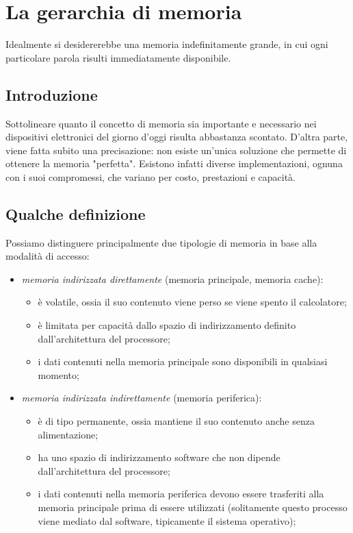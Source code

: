 \documentclass[class=book, crop=false, oneside]{standalone}
\begin{document}
\chapter{La gerarchia di memoria}\begin{fquote}Idealmente si desidererebbe una memoria indefinitamente grande, in cui ogni particolare parola risulti immediatamente disponibile.
 \end{fquote}

\section{Introduzione}
Sottolineare quanto il concetto di memoria sia importante e necessario nei dispositivi elettronici del giorno d'oggi risulta abbastanza scontato. D'altra parte, viene fatta subito una precisazione: non esiste un'unica soluzione che permette di ottenere la memoria "perfetta". Esistono infatti diverse implementazioni, ognuna con i suoi compromessi, che variano per costo, prestazioni e capacità.

\section*{Qualche definizione}
Possiamo distinguere principalmente due tipologie di memoria in base alla modalità di accesso:
\begin{itemize}
	\item \emph{memoria indirizzata direttamente} (memoria principale, memoria cache):
	\begin{itemize}
		\item è volatile, ossia il suo contenuto viene perso se viene spento il calcolatore;
		\item è limitata per capacità dallo spazio di indirizzamento definito dall'architettura del processore;
		\item i dati contenuti nella memoria principale sono disponibili in qualsiasi momento;
	\end{itemize}
	\item \emph{memoria indirizzata indirettamente} (memoria periferica):
	\begin{itemize}
		\item è di tipo permanente, ossia mantiene il suo contenuto anche senza alimentazione;
		\item ha uno spazio di indirizzamento software che non dipende dall'architettura del processore;
		\item i dati contenuti nella memoria periferica devono essere trasferiti alla memoria principale prima di essere utilizzati (solitamente questo processo viene mediato dal software, tipicamente il sistema operativo);
	\end{itemize}
\end{itemize}
\end{document}
